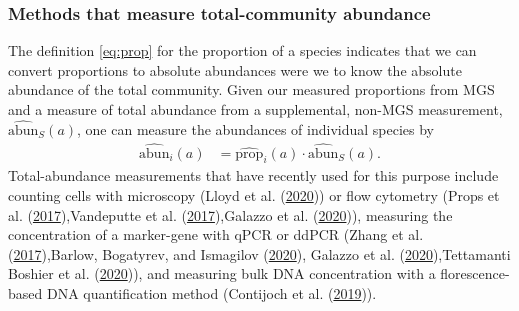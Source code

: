 \documentclass[
]{article}
\begin{document}
\hypertarget{methods-that-measure-total-community-abundance}{%
\subsubsection{Methods that measure total-community abundance}\label{methods-that-measure-total-community-abundance}}

The definition \eqref{eq:prop} for the proportion of a species indicates that we can convert proportions to absolute abundances were we to know the absolute abundance of the total community.
Given our measured proportions from MGS and a measure of total abundance from a supplemental, non-MGS measurement, \(\widehat{\text{abun}}_{S}(a)\), one can measure the abundances of individual species by
\begin{align}
  \label{eq:density-prop-meas}
  \widehat{\text{abun}}_{i}(a) 
  &= \widehat{\text{prop}}_{i}(a) \cdot \widehat{\text{abun}}_S(a).
\end{align}
Total-abundance measurements that have recently used for this purpose include counting cells with microscopy (Lloyd et al. (\protect\hyperlink{ref-lloyd2020evid}{2020})) or flow cytometry (Props et al. (\protect\hyperlink{ref-props2017abso}{2017}),Vandeputte et al. (\protect\hyperlink{ref-vandeputte2017quan}{2017}),Galazzo et al. (\protect\hyperlink{ref-galazzo2020howt}{2020})), measuring the concentration of a marker-gene with qPCR or ddPCR (Zhang et al. (\protect\hyperlink{ref-zhang2017soil}{2017}),Barlow, Bogatyrev, and Ismagilov (\protect\hyperlink{ref-barlow2020aqau}{2020}), Galazzo et al. (\protect\hyperlink{ref-galazzo2020howt}{2020}),Tettamanti Boshier et al. (\protect\hyperlink{ref-tettamantiboshier2020comp}{2020})), and measuring bulk DNA concentration with a florescence-based DNA quantification method (Contijoch et al. (\protect\hyperlink{ref-contijoch2019gutm}{2019})).
\end{document}

